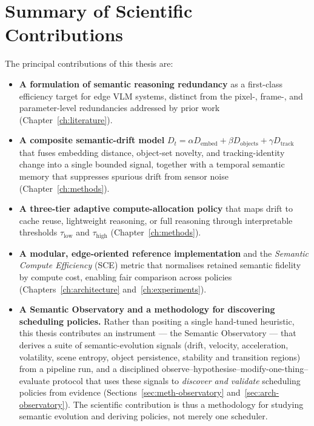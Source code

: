 \section{Summary of Scientific Contributions}
\label{sec:intro-contributions}

The principal contributions of this thesis are:

\begin{itemize}
  \item \textbf{A formulation of semantic reasoning redundancy} as a
  first-class efficiency target for edge VLM systems, distinct from the
  pixel-, frame-, and parameter-level redundancies addressed by prior work
  (Chapter~\ref{ch:literature}).
  \item \textbf{A composite semantic-drift model} $D_t = \alpha D_{\text{embed}}
  + \beta D_{\text{objects}} + \gamma D_{\text{track}}$ that fuses embedding
  distance, object-set novelty, and tracking-identity change into a single
  bounded signal, together with a temporal semantic memory that suppresses
  spurious drift from sensor noise (Chapter~\ref{ch:methods}).
  \item \textbf{A three-tier adaptive compute-allocation policy} that maps
  drift to cache reuse, lightweight reasoning, or full reasoning through
  interpretable thresholds $\tau_{\text{low}}$ and $\tau_{\text{high}}$
  (Chapter~\ref{ch:methods}).
  \item \textbf{A modular, edge-oriented reference implementation} and the
  \emph{Semantic Compute Efficiency} (SCE) metric that normalises retained
  semantic fidelity by compute cost, enabling fair comparison across policies
  (Chapters~\ref{ch:architecture} and~\ref{ch:experiments}).
  \item \textbf{A Semantic Observatory and a methodology for discovering
  scheduling policies.} Rather than positing a single hand-tuned heuristic,
  this thesis contributes an instrument --- the Semantic Observatory --- that
  derives a suite of semantic-evolution signals (drift, velocity,
  acceleration, volatility, scene entropy, object persistence, stability and
  transition regions) from a pipeline run, and a disciplined
  observe--hypothesise--modify-one-thing--evaluate protocol that uses these
  signals to \emph{discover and validate} scheduling policies from evidence
  (Sections~\ref{sec:meth-observatory} and~\ref{sec:arch-observatory}). The
  scientific contribution is thus a methodology for studying semantic
  evolution and deriving policies, not merely one scheduler.
\end{itemize}


